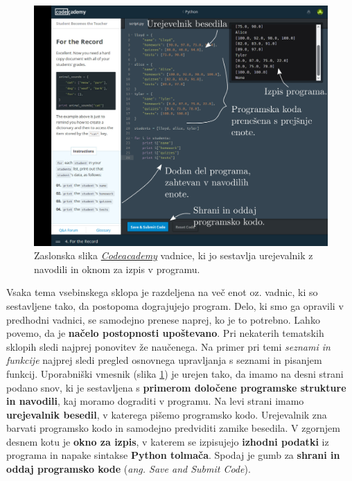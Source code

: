\begin{figure}[h!]
  \centering
    \includegraphics [width=0.65\linewidth, keepaspectratio =
   1] {./images/sc_web/codeacademy_IDE_02.jpg}
   \caption{Zaslonska slika
     \emph{\href{https://www.codecademy.com/}{Codeacademy}}
     \cite{web:codeacademy} vadnice, ki jo sestavlja urejevalnik z
     navodili in oknom za izpis v programu.}
    \label{fig:scr:web:codeacademy:ide}
\end{figure}

Vsaka tema vsebinskega sklopa je razdeljena na več enot oz. vadnic, ki
so sestavljene tako, da postopoma dograjujejo program. Delo, ki smo ga
opravili v predhodni vadnici, se samodejno prenese naprej, ko je to
potrebno. Lahko povemo, da je \textbf{načelo postopnosti
  upoštevano}. Pri nekaterih tematskih sklopih sledi najprej ponovitev
že naučenega. Na primer pri temi \emph{seznami in funkcije} najprej
sledi pregled osnovnega upravljanja s seznami in pisanjem funkcij.
Uporabniški vmesnik (slika \ref{fig:scr:web:codeacademy:ide}) je
urejen tako, da imamo na desni strani podano snov, ki je sestavljena s
\textbf{primerom določene programske strukture in navodili}, kaj
moramo dograditi v programu. Na levi strani imamo \textbf{urejevalnik
  besedil}, v katerega pišemo programsko kodo. Urejevalnik zna barvati
programsko kodo in samodejno predviditi zamike besedila. V zgornjem
desnem kotu je \textbf{okno za izpis}, v katerem se izpisujejo
\textbf{izhodni podatki} iz programa in napake sintakse \textbf{Python
  tolmača}. Spodaj je gumb za \textbf{shrani in oddaj programsko kode}
(\emph{ang. Save and Submit Code}).

